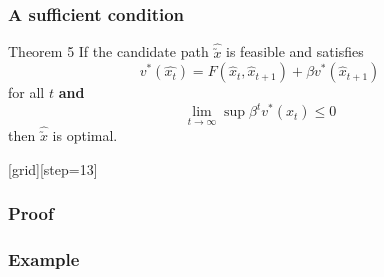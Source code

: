 \documentclass[aspectratio=169]{beamer}
\begin{document}
\begin{frame}
\frametitle{A sufficient condition}
\begin{block}{Theorem 5}
If the candidate path $\hat{\utilde{x}}$ is feasible and satisfies 
\begin{equation*}
v^{*}(\hat{x_{t}}) = F(\hat{x}_{t}, \hat{x}_{t+1}) + \beta v^{*}(\hat{x}_{t+1})
\end{equation*}
for all $t$ \textbf{and}
\begin{equation*}
\lim_{t \to \infty} \sup \beta^{t}v^{*}(\hat{x}_{t}) \leq 0 
\end{equation*}
then $\hat{\utilde{x}}$ is optimal.
\end{block}
\end{frame}

{
[grid][step=13]

\begin{frame}
\frametitle{Proof}
\end{frame}

\begin{frame}[t]
\frametitle{Example}

\end{frame}

}
\end{document}
